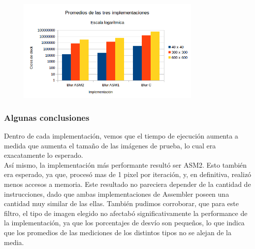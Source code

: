 \begin{figure}[ht]
\centering
\includegraphics[width=90mm]{blur/graficoBlur_cte.png}
\end{figure}

\subsubsection{Algunas conclusiones}
Dentro de cada implementación, vemos que el tiempo de ejecución aumenta a medida que aumenta el tamaño de las imágenes de prueba, lo cual era exacatamente lo esperado.\\
Así mismo, la implementación más performante resultó ser ASM2. Esto también era esperado, ya que, procesó mas de 1 pixel por iteración, y, en definitiva, realizó menos accesos a memoria. Este resultado no pareciera depender de la cantidad de instrucciones, dado que ambas implementaciones de Assembler poseen una cantidad muy similar de las ellas. 
También pudimos corroborar, que para este filtro, el tipo de imagen elegido no afectabó significativamente la performance de la implementación, ya que los porcentajes de desvío son pequeños, lo que indica que los promedios de las mediciones de los distintos tipos no se alejan de la media.\\


